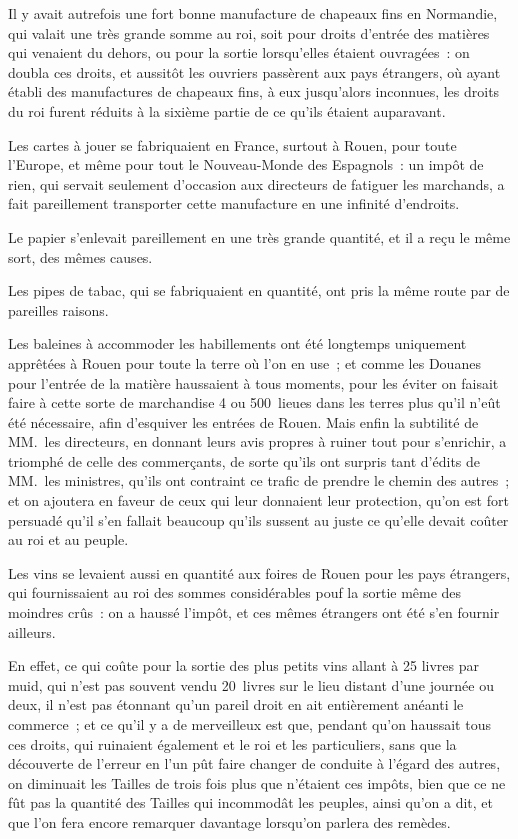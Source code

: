 \documentclass[french,twoside]{book} %
\begin{document}
Il y avait autrefois une fort bonne manufacture de chapeaux fins en Normandie, qui valait une très grande somme au roi, soit pour droits d’entrée des matières qui venaient du dehors, ou pour la sortie lorsqu’elles étaient ouvragées : on doubla ces droits, et aussitôt les ouvriers passèrent aux pays étrangers, où ayant établi des manufactures de chapeaux fins, à eux jusqu’alors inconnues, les droits du roi furent réduits à la sixième partie de ce qu’ils étaient auparavant.\par
Les cartes à jouer se fabriquaient en France, surtout à Rouen, pour toute l’Europe, et même pour tout le Nouveau-Monde des Espagnols : un impôt de rien, qui servait seulement d’occasion aux directeurs de fatiguer les marchands, a fait pareillement transporter cette manufacture en une infinité d’endroits.\par
Le papier s’enlevait pareillement en une très grande quantité, et il a reçu le même sort, des mêmes causes.\par
Les pipes de tabac, qui se fabriquaient en quantité, ont pris la même route par de pareilles raisons.\par
Les baleines à accommoder les habillements ont été longtemps uniquement apprêtées à Rouen pour toute la terre où l’on en use ; et comme les Douanes pour l’entrée de la matière haussaient à tous moments, pour les éviter on faisait faire à cette sorte de marchandise 4 ou 500 lieues dans les terres plus qu’il n’eût été nécessaire, afin d’esquiver les entrées de Rouen. Mais enfin la subtilité de MM. les directeurs, en donnant leurs avis propres à ruiner tout pour s’enrichir, a triomphé de celle des commerçants, de sorte qu’ils ont surpris tant d’édits de MM. les ministres, qu’ils ont contraint ce trafic de prendre le chemin des autres ; et on ajoutera en faveur de ceux qui leur donnaient leur protection, qu’on est fort persuadé qu’il s’en fallait beaucoup qu’ils sussent au juste ce qu’elle devait coûter au roi et au peuple.\par
Les vins se levaient aussi en quantité aux foires de Rouen pour les pays étrangers, qui fournissaient au roi des sommes considérables pouf la sortie même des moindres crûs : on a haussé l’impôt, et ces mêmes étrangers ont été s’en fournir ailleurs.\par
En effet, ce qui coûte pour la sortie des plus petits vins allant à 25 livres par muid, qui n’est pas souvent vendu 20 livres sur le lieu distant d’une journée ou deux, il n’est pas étonnant qu’un pareil droit en ait entièrement anéanti le commerce ; et ce qu’il y a de merveilleux est que, pendant qu’on haussait tous ces droits, qui ruinaient également et le roi et les particuliers, sans que la découverte de l’erreur en l’un pût faire changer de conduite à l’égard des autres, on diminuait les Tailles de trois fois plus que n’étaient ces impôts, bien que ce ne fût pas la quantité des Tailles qui incommodât les peuples, ainsi qu’on a dit, et que l’on fera encore remarquer davantage lorsqu’on parlera des remèdes.
\end{document}

